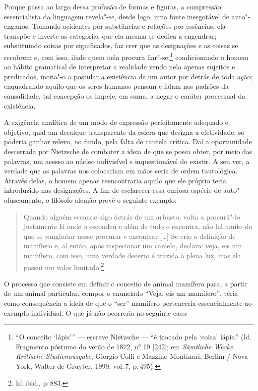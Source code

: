 Porque passa ao largo dessa profusão de formas e figuras, a compressão
essencialista da linguagem revela"-se, desde logo, uma fonte
inesgotável de auto"-enganos. Tomando acidentes por substâncias e
relações por essências, ela transpõe e inverte as categorias que ela mesma
se dedica a engendrar; substituindo coisas por significados, faz crer
que as designações e as coisas se recobrem e, com isso, ilude quem nela
procura fiar"-se;\footnote{ “O conceito ‘lápis’” --- escreve Nietzsche ---
“é trocado pela ‘coisa’ lápis.” (Id.\,Fragmento póstumo do verão de
1872, n° 19 [242]; em \textit{Sämtliche Werke. Kritische
Studienausgabe}, Giorgio Colli e Mazzino Montinari, Berlim / Nova
York, Walter de Gruyter, 1999, vol.\,7, p.\,495).} condicionando o homem
ao hábito gramatical de interpretar a realidade vendo nela apenas
sujeitos e predicados, incita"-o a postular a existência de um autor
por detrás de toda ação; enquadrando aquilo que os seres humanos pensam
e falam nos padrões da causalidade, tal concepção os impele, em
suma, a negar o caráter processual da existência.

A exigência analítica de um modo de expressão perfeitamente
adequado e objetivo, qual um decalque transparente da esfera que
designa a efetividade, só poderia ganhar relevo, no fundo, pela falta de
cautela crítica. Daí a oportunidade descerrada por Nietzsche de
combater a ideia de que se possa obter, por meio das palavras, um
acesso ao núcleo indivisível e inquestionável do existir. 
A seu ver, a verdade que as
palavras nos colocariam em mãos seria de ordem tautológica. Através
delas, o homem apenas reencontraria aquilo que ele próprio teria
introduzido nas designações. A fim de esclarecer essa curiosa espécie
de auto"-ofuscamento, o filósofo alemão provê o seguinte exemplo:

\begin{quote}
Quando alguém esconde algo detrás de um arbusto, volta a
procurá"-lo justamente lá onde o escondeu e além de tudo o encontra,
não há muito do que se vangloriar nesse procurar e encontrar [\ldots{}] Se
crio a definição de mamífero e, aí então, após inspecionar um camelo,
declaro: veja, eis um mamífero, com isso, uma verdade decerto é trazida
à plena luz, mas ela possui um valor limitado.\footnote{ Id.\,ibid., p.\,883.}
\end{quote}

O processo que consiste em definir o conceito de animal mamífero para,
a partir de um animal particular, compor o enunciado “Veja,
eis um mamífero”, teria como consequência a ideia de que o “ser”
mamífero pertenceria essencialmente ao exemplo individual. O que já não
ocorreria no seguinte caso: 

